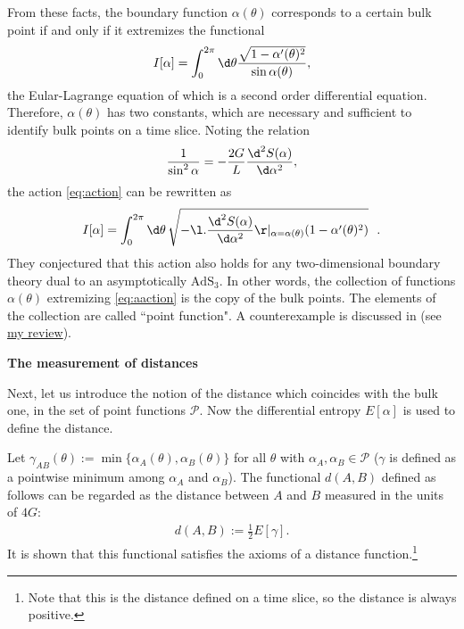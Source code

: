 \documentclass[12pt]{article}
\begin{document}
From these facts, the boundary function $\alpha(\theta)$ corresponds to a certain bulk point if and only if it extremizes the functional
\begin{align}
	I[\alpha] = \int_0^{2\pi}\d\theta \frac{\sqrt{1-\alpha'(\theta)^2}}{\sin\alpha(\theta)},\label{eq:action}
\end{align}
the Eular-Lagrange equation of which is a second order differential equation.
Therefore, $\alpha(\theta)$ has two constants, which are necessary and sufficient to identify bulk points on a time slice.
Noting the relation
\begin{align}
	\frac{1}{\sin^2\alpha} = -\frac{2G}{L}\frac{\d^2S(\alpha)}{\d\alpha^2},
\end{align}
the action \eqref{eq:action} can be rewritten as 
\begin{align}
	I[\alpha] = \int_0^{2\pi}\d\theta\,\sqrt{-\l.\frac{\d^2S(\alpha)}{\d\alpha^2}\r|_{\alpha = \alpha(\theta)}(1-\alpha'(\theta)^2)}~~.\label{eq:aaction}
\end{align}
They conjectured that this action also holds for any two-dimensional boundary theory dual to an asymptotically $\mathrm{AdS}_3$.
In other words, the collection of functions $\alpha(\theta)$ extremizing \eqref{eq:aaction} is the copy of the bulk points.
The elements of the collection are called ``point function".
A counterexample is discussed in \cite{Burda:2018rpb} (see \href{https://albertmcc.github.io/reviews/holographic_bubble.pdf}{\color{blue}my review}).


\noindent
\textbf{The measurement of distances}

Next, let us introduce the notion of the distance which coincides with the bulk one, in the set of point functions $\mathcal P$.
Now the differential entropy $E[\alpha]$ is used to define the distance.

Let $\gamma_{AB}(\theta) := \min\{\alpha_A(\theta),\alpha_B(\theta)\}$ for all $\theta$ with $\alpha_A,\alpha_B\in\mathcal P$ ($\gamma$ is defined as a pointwise minimum among $\alpha_A$ and $\alpha_B$).
The functional $d(A,B)$ defined as follows can be regarded as the distance between $A$ and $B$ measured in the units of $4G$:
\begin{align}
	d(A,B) := \frac{1}{2}E[\gamma].\label{eq:dist}
\end{align}
It is shown that this functional satisfies the axioms of a distance function.\footnote{
Note that this is the distance defined on a time slice, so the distance is always positive.}
\end{document}
